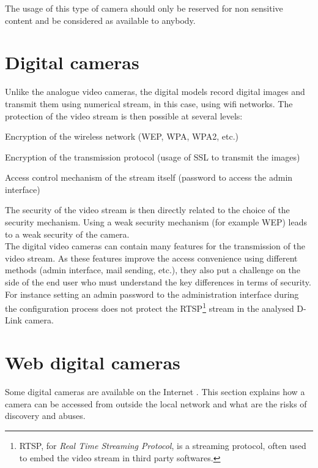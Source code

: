 The usage of this type of camera should only be reserved for non sensitive content and be considered as available to anybody.

\section{Digital cameras}
\label{sec:cam-digital}

Unlike the analogue video cameras, the digital models record digital images and transmit them using numerical stream, in this case, using wifi networks.
The protection of the video stream is then possible at several levels:\\

\begin{itemizealt}
\item Encryption of the wireless network (WEP, WPA, WPA2, etc.)
\item Encryption of the transmission protocol (usage of SSL to transmit the images)
\item Access control mechanism of the stream itself (password to access the admin interface)
\end{itemizealt}

The security of the video stream is then directly related to the choice of the security mechanism.
Using a weak security mechanism (for example WEP) leads to a weak security of the camera.\\

The digital video cameras can contain many features for the transmission of the video stream.
As these features improve the access convenience using different methods (admin interface, mail sending, etc.), they also put a challenge on the side of the end user who must understand the key differences in terms of security.
For instance setting an admin password to the administration interface during the configuration process does not protect the RTSP\footnote{RTSP, for \emph{Real Time Streaming Protocol}, is a streaming protocol, often used to embed the video stream in third party softwares.} stream in the analysed D-Link camera.

\section{Web digital cameras}
\label{sec:cam-google}

Some digital cameras are available on the Internet .
This section explains how a camera can be accessed from outside the local network and what are the risks of discovery and abuses.

